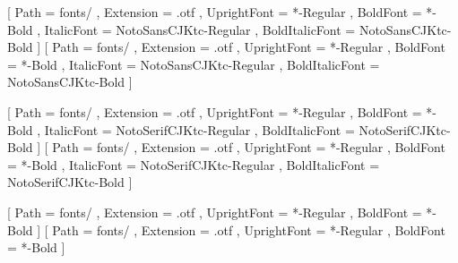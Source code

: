 \usepackage{amsmath}
\usepackage{amsthm}

\usepackage{notomath}
\usepackage{xeCJK}

[
	Path			= fonts/ ,
	Extension		= .otf ,
	UprightFont		= *-Regular ,
	BoldFont		= *-Bold ,
	ItalicFont		= NotoSansCJKtc-Regular ,
	BoldItalicFont	= NotoSansCJKtc-Bold
]
\setmainfont{NotoSerifCJKtc}[
	Path			= fonts/ ,
	Extension		= .otf ,
	UprightFont		= *-Regular ,
	BoldFont		= *-Bold ,
	ItalicFont		= NotoSansCJKtc-Regular ,
	BoldItalicFont	= NotoSansCJKtc-Bold
]

[
	Path			= fonts/ ,
	Extension		= .otf ,
	UprightFont		= *-Regular ,
	BoldFont		= *-Bold ,
	ItalicFont		= NotoSerifCJKtc-Regular ,
	BoldItalicFont	= NotoSerifCJKtc-Bold
]
\setsansfont{NotoSansCJKtc}[
	Path			= fonts/ ,
	Extension		= .otf ,
	UprightFont		= *-Regular ,
	BoldFont		= *-Bold ,
	ItalicFont		= NotoSerifCJKtc-Regular ,
	BoldItalicFont	= NotoSerifCJKtc-Bold
]

[
	Path		= fonts/ ,
	Extension	= .otf ,
	UprightFont	= *-Regular ,
	BoldFont	= *-Bold
]
\setmonofont{NotoSansMonoCJKtc}[
	Path		= fonts/ ,
	Extension	= .otf ,
	UprightFont	= *-Regular ,
	BoldFont	= *-Bold
]
